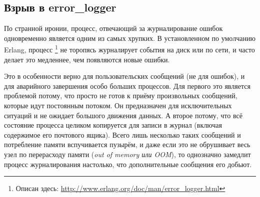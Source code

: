 \subsection{Взрыв в error\_logger}

По странной иронии, процесс, отвечающий за журналирование ошибок одновременно является одним из самых хрупких. В установленном по умолчанию Erlang, процесс \footnote{Описан здесь: \href{http://www.erlang.org/doc/man/error\_logger.html}{http://www.erlang.org/doc/man/error\_logger.html}} не торопясь журналирует события на диск или по сети, и часто делает это медленнее, чем появляются новые ошибки.

Это в особенности верно для пользовательских сообщений (не для ошибок), и для аварийного завершения особо больших процессов. Для первого это является проблемой потому, что  просто не готов к приёму произвольных сообщений, которые идут постоянным потоком. Он предназначен для исключительных ситуаций и не ожидает большого движения данных. А второе потому, что всё состояние процесса целиком копируется для записи в журнал (включая содержимое его почтового ящика). Всего лишь несколько таких сообщений и потребление памяти вспучивается пузырём, и даже если это не обрушивает весь узел по перерасходу памяти (\emph{out of memory или OOM}), то однозначно замедлит процесс журналирования настолько, что дополнительные сообщения его добьют.

